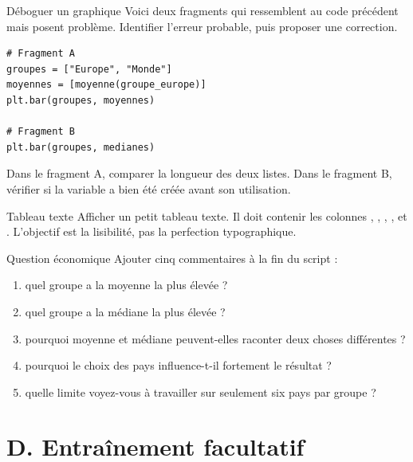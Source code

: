 \documentclass[11pt,a4paper]{article}
\begin{document}
\begin{mandatoryexercise}{Déboguer un graphique}
Voici deux fragments qui ressemblent au code précédent mais posent problème. Identifier l'erreur probable, puis proposer une correction.
\begin{lstlisting}
# Fragment A
groupes = ["Europe", "Monde"]
moyennes = [moyenne(groupe_europe)]
plt.bar(groupes, moyennes)

# Fragment B
plt.bar(groupes, medianes)
\end{lstlisting}
Dans le fragment A, comparer la longueur des deux listes. Dans le fragment B, vérifier si la variable  a bien été créée avant son utilisation.
\end{mandatoryexercise}

\begin{mandatoryexercise}{Tableau texte}
Afficher un petit tableau texte.
Il doit contenir les colonnes , , , ,  et .
L'objectif est la lisibilité, pas la perfection typographique.
\end{mandatoryexercise}

\begin{mandatoryexercise}{Question économique}
Ajouter cinq commentaires à la fin du script :
\begin{enumerate}
  \item quel groupe a la moyenne la plus élevée ?
  \item quel groupe a la médiane la plus élevée ?
  \item pourquoi moyenne et médiane peuvent-elles raconter deux choses différentes ?
  \item pourquoi le choix des pays influence-t-il fortement le résultat ?
  \item quelle limite voyez-vous à travailler sur seulement six pays par groupe ?
\end{enumerate}
\end{mandatoryexercise}

\section*{D. Entraînement facultatif}
\end{document}
